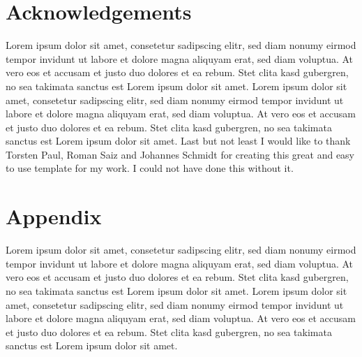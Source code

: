 \documentclass[egregdoesnotlikesansseriftitles, 12pt]{scrartcl}
\begin{document}
\section*{Acknowledgements}
Lorem ipsum dolor sit amet, consetetur sadipscing elitr, sed diam nonumy eirmod tempor invidunt ut labore et dolore magna aliquyam erat, sed diam voluptua. At vero eos et accusam et justo duo dolores et ea rebum. Stet clita kasd gubergren, no sea takimata sanctus est Lorem ipsum dolor sit amet. Lorem ipsum dolor sit amet, consetetur sadipscing elitr, sed diam nonumy eirmod tempor invidunt ut labore et dolore magna aliquyam erat, sed diam voluptua. At vero eos et accusam et justo duo dolores et ea rebum. Stet clita kasd gubergren, no sea takimata sanctus est Lorem ipsum dolor sit amet.\newline
Last but not least I would like to thank Torsten Paul, Roman Saiz and Johannes Schmidt for creating this great and easy to use template for my work. I could not have done this without it.
\newpage

\section*{Appendix}
Lorem ipsum dolor sit amet, consetetur sadipscing elitr, sed diam nonumy eirmod tempor invidunt ut labore et dolore magna aliquyam erat, sed diam voluptua. At vero eos et accusam et justo duo dolores et ea rebum. Stet clita kasd gubergren, no sea takimata sanctus est Lorem ipsum dolor sit amet. Lorem ipsum dolor sit amet, consetetur sadipscing elitr, sed diam nonumy eirmod tempor invidunt ut labore et dolore magna aliquyam erat, sed diam voluptua. At vero eos et accusam et justo duo dolores et ea rebum. Stet clita kasd gubergren, no sea takimata sanctus est Lorem ipsum dolor sit amet.
\end{document}

